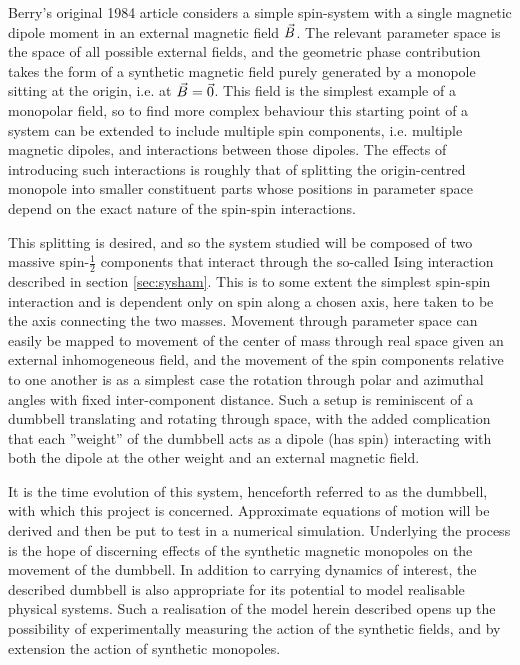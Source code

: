 \documentclass[main.tex]{subfiles}
\begin{document}
\label{sec:aselsys}
Berry's original 1984 article considers a simple spin-system with a single magnetic dipole
moment in an external magnetic field \(\vec{B}\). The relevant parameter space is the space of all
possible external fields, and the geometric phase contribution takes the form of a
synthetic magnetic field purely generated by a monopole sitting at the origin, i.e. at
\(\vec{B} = \vec{0}\). This field is the simplest example of a monopolar field,
so to find more complex behaviour this starting point of a system can be extended to
include multiple spin components, i.e. multiple magnetic dipoles, and interactions between
those dipoles. The effects of introducing such interactions is roughly that of splitting
the origin-centred monopole into smaller constituent parts whose positions in parameter space
depend on the exact nature of the spin-spin interactions\cite{eriksson}.

This splitting is desired, and so the system studied will be composed of two massive
spin-\(\frac{1}{2}\) components that interact through the so-called Ising interaction
described in section \ref{sec:sysham}. This is to some extent the simplest spin-spin
interaction and is dependent only on spin along a chosen axis, here taken to be the axis
connecting the two masses. Movement through
parameter space can easily be mapped to movement of the center of mass through real space given an external
inhomogeneous field, and the movement of the spin components relative to one another is as
a simplest case the rotation through polar and azimuthal angles with fixed inter-component
distance. Such a setup is reminiscent of a dumbbell translating and rotating through space,
with the added complication that each ''weight'' of the dumbbell acts as a dipole (has
spin) interacting with both the dipole at the other weight and an external magnetic field. %

It is the time evolution of this system, henceforth referred to as the dumbbell, with which
this project is concerned. Approximate equations of motion will be derived and then be put
to test in a numerical simulation. Underlying the process is the hope of discerning effects of the synthetic
magnetic monopoles on the movement of the dumbbell.
In addition to carrying dynamics of interest, the described dumbbell is also appropriate
for its potential to model realisable physical systems. Such a realisation of the model
herein described opens up the possibility of experimentally measuring the action of the
synthetic fields, and by extension the action of synthetic monopoles.
\end{document}
